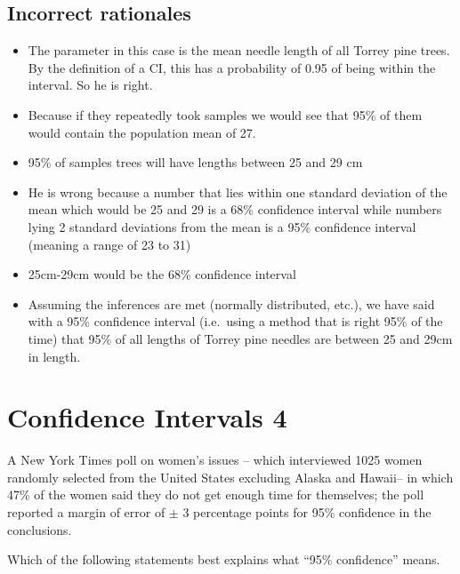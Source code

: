 \documentclass[letterpaper,12pt,twoside,printwatermark=false]{pinp}
\providecommand{\tightlist}{%
  \setlength{\itemsep}{0pt}\setlength{\parskip}{0pt}}
\begin{document}
\hypertarget{incorrect-rationales-4}{%
\subsection{Incorrect rationales}\label{incorrect-rationales-4}}

\begin{itemize}
\tightlist
\item
  The parameter in this case is the mean needle length of all Torrey
  pine trees. By the definition of a CI, this has a probability of 0.95
  of being within the interval. So he is right.
\item
  Because if they repeatedly took samples we would see that 95\% of them
  would contain the population mean of 27.
\item
  95\% of samples trees will have lengths between 25 and 29 cm
\item
  He is wrong because a number that lies within one standard deviation
  of the mean which would be 25 and 29 is a 68\% confidence interval
  while numbers lying 2 standard deviations from the mean is a 95\%
  confidence interval (meaning a range of 23 to 31)
\item
  25cm-29cm would be the 68\% confidence interval
\item
  Assuming the inferences are met (normally distributed, etc.), we have
  said with a 95\% confidence interval (i.e.~using a method that is
  right 95\% of the time) that 95\% of all lengths of Torrey pine
  needles are between 25 and 29cm in length.
\end{itemize}

\hypertarget{confidence-intervals-4}{%
\section{Confidence Intervals 4}\label{confidence-intervals-4}}

A New York Times poll on women's issues -- which interviewed 1025 women
randomly selected from the United States excluding Alaska and Hawaii--
in which 47\% of the women said they do not get enough time for
themselves; the poll reported a margin of error of \(\pm\) 3 percentage
points for 95\% confidence in the conclusions.

Which of the following statements best explains what ``95\% confidence''
means.
\end{document}

